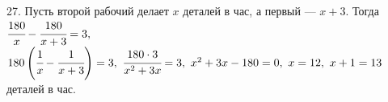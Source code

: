 27. Пусть второй рабочий делает $x$ деталей в час, а первый --- $x+3.$ Тогда $\cfrac{180}{x}-\cfrac{180}{x+3}=3,$\\$ 180\left(\cfrac{1}{x}-\cfrac{1}{x+3}\right)=3,\
\cfrac{180\cdot3}{x^2+3x}=3,\ x^2+3x-180=0,\ x=12,\ x+1=13$ деталей в час.\\
